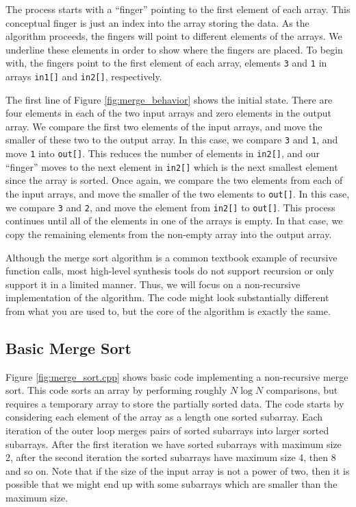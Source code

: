 The process starts with a ``finger'' pointing to the first element of each array.  This conceptual finger is just an index into the array storing the data.  As the algorithm proceeds, the fingers will point to different elements of the arrays. We underline these elements in order to show where the fingers are placed.  To begin with, the fingers point to the first element of each array, elements \lstinline{3} and \lstinline{1} in arrays \lstinline{in1[]} and \lstinline{in2[]}, respectively.

The first line of Figure \ref{fig:merge_behavior} shows the initial state. There are four elements in each of the two input arrays and zero elements in the output array. We compare the first two elements of the input arrays, and move the smaller of these two to the output array. In this case, we compare \lstinline{3} and \lstinline{1}, and move \lstinline{1} into \lstinline{out[]}. This reduces the number of elements in \lstinline{in2[]}, and our ``finger'' moves to the next element in \lstinline{in2[]} which is the next smallest element since the array is sorted. Once again, we compare the two elements from each of the input arrays, and move the smaller of the two elements to \lstinline{out[]}. In this case, we compare \lstinline{3} and \lstinline{2}, and move the element from \lstinline{in2[]} to \lstinline{out[]}. This process continues until all of the elements in one of the arrays is empty. In that case, we copy the remaining elements from the non-empty array into the output array.

Although the merge sort algorithm is a common textbook example of recursive function calls, most high-level synthesis tools do not support recursion or only support it in a limited manner. Thus, we will focus on a non-recursive implementation of the algorithm.  The code might look substantially different from what you are used to, but the core of the algorithm is exactly the same.

\subsection{Basic Merge Sort}

Figure \ref{fig:merge_sort.cpp} shows basic code implementing a non-recursive merge sort.  This code sorts an array by performing roughly $N \log N$ comparisons, but requires a temporary array to store the partially sorted data. The code starts by considering each element of the array as a length one sorted subarray.  Each iteration of the outer loop merges pairs of sorted subarrays into larger sorted subarrays.  After the first iteration we have sorted subarrays with maximum size 2, after the second iteration the sorted subarrays have maximum size 4, then 8 and so on.  Note that if the size of the input array is not a power of two, then it is possible that we might end up with some subarrays which are smaller than the maximum size.

